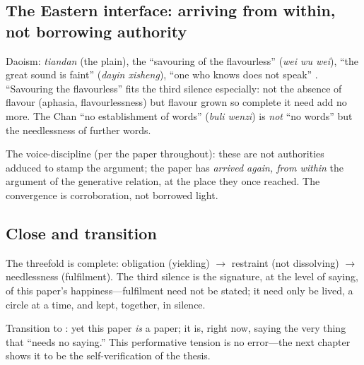\subsection{The Eastern interface: arriving from within, not borrowing authority}
\label{p19:sub:silence-east}

Daoism: \emph{tiandan} (the plain), the ``savouring of the flavourless'' (\emph{wei wu wei}), ``the great sound is faint'' (\emph{dayin xisheng}), ``one who knows does not speak'' \parencite{laozi1963,zhuangzi2009}. ``Savouring the flavourless'' fits the third silence especially: not the absence of flavour (aphasia, flavourlessness) but flavour grown so complete it need add no more. The Chan ``no establishment of words'' (\emph{buli wenzi}) is \emph{not} ``no words'' but the needlessness of further words.

The voice-discipline (per the paper throughout): these are not authorities adduced to stamp the argument; the paper has \emph{arrived again, from within} the argument of the generative relation, at the place they once reached. The convergence is corroboration, not borrowed light.

\subsection{Close and transition}
\label{p19:sub:silence-close}

The threefold is complete: obligation (yielding) $\to$ restraint (not dissolving) $\to$ needlessness (fulfilment). The third silence is the signature, at the level of saying, of this paper's happiness---fulfilment need not be stated; it need only be lived, a circle at a time, and kept, together, in silence.

Transition to : yet this paper \emph{is} a paper; it is, right now, saying the very thing that ``needs no saying.'' This performative tension is no error---the next chapter shows it to be the self-verification of the thesis.
